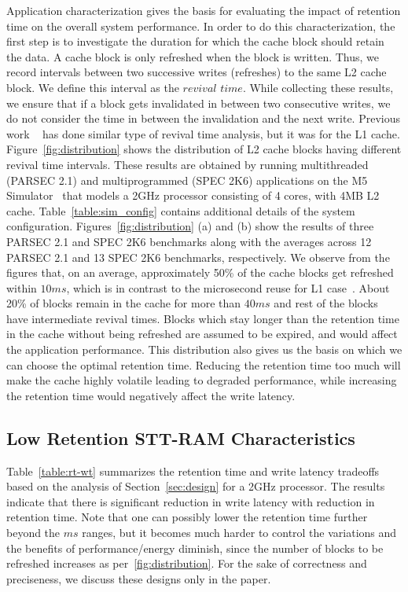 Application characterization gives the basis for evaluating the impact of retention time on the
overall system performance. In order to do this characterization, the first step is to investigate
the duration for which the cache block should retain the data.  A cache block is only refreshed when
the block is written. Thus, we record intervals between two successive writes (refreshes) to the same
L2 cache block. We define this interval as the $revival$ $time$. While collecting these results, we
ensure that if a block gets invalidated in between two consecutive writes, we do not consider the
time in between the invalidation and the next write. Previous work ~\cite{3t1d-cache} has done
similar type of revival time analysis, but it was for the L1 cache. Figure~\ref{fig:distribution}
shows the distribution of L2 cache blocks having different revival time intervals. These results are
obtained by running multithreaded (PARSEC 2.1) and multiprogrammed (SPEC 2K6)
applications on the M5 Simulator~\cite{M5} that models a 2GHz processor consisting of 4 cores, with
4MB L2 cache. Table~\ref{table:sim_config} contains additional details of the system configuration.
Figures~\ref{fig:distribution} (a) and (b) show the results of three PARSEC 2.1
and SPEC 2K6 benchmarks along
with the averages across 12 PARSEC 2.1  and 13 SPEC 2K6 benchmarks, respectively. We observe from the figures
that, on an average, approximately 50\% of the cache blocks get refreshed within $10ms$, which is
in contrast to the microsecond reuse for L1 case~\cite{3t1d-cache}. About 20\% of blocks remain in
the cache for more than $40ms$ and rest of the blocks have intermediate revival times. Blocks
which stay longer than the retention time in the cache without being refreshed are assumed to be
expired, and would affect the application performance. This distribution also gives us the
basis on which we can choose the optimal retention time. Reducing the retention time too much will
make the cache highly volatile leading to degraded performance, while increasing the retention time
would negatively affect the write latency.



\subsection{Low Retention STT-RAM Characteristics}
Table~\ref{table:rt-wt} summarizes the retention time and write latency tradeoffs based on the analysis of Section~\ref{sec:design}
for a 2GHz processor.
The results indicate that there is significant reduction in write latency with reduction in retention time.
Note that one can possibly lower the retention time further beyond the $ms$ ranges, but it becomes much harder to control the variations and the benefits of performance/energy diminish, since the number of blocks to be refreshed increases as per~\ref{fig:distribution}. For the sake of correctness and preciseness, we discuss these designs only in the paper.


